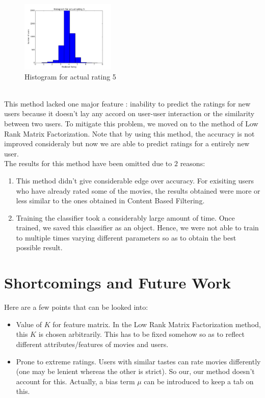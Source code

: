 \documentclass[twocolumn]{article}
\begin{document}
\begin{figure}
\centering
\includegraphics[width=0.4\textwidth]{hist_5.png}
\caption{Histogram for actual rating 5}
\end{figure}\\
\newline
This method lacked one major feature : inability to predict the ratings for new users because it doesn't lay any accord on user-user interaction or the similarity between two users. To mitigate this problem, we moved on to the method of Low Rank Matrix Factorization. Note that by using this method, the accuracy is not improved consideraly but now we are able to predict ratings for a entirely new user.\\
\newline
The results for this method have been omitted due to $2$ reasons:
\begin{enumerate}
\item This method didn't give considerable edge over accuracy. For exisiting users who have already rated some of the movies, the results obtained were more or less similar to the ones obtained in Content Based Filtering.
\item Training the classifier took a considerably large amount of time. Once trained, we saved this classifier as an object. Hence, we were not able to train to multiple times varying different parameters so as to obtain the best possible result.
\end{enumerate}
\section*{Shortcomings and Future Work}
Here are a few points that can be looked into:
\begin{itemize}
\item Value of $K$ for feature matrix. In the Low Rank Matrix Factorization method, this $K$ is chosen arbitrarily. This has to be fixed somehow so as to reflect different attributes/features of movies and users.
\item Prone to extreme ratings. Users with similar tastes can rate movies differently (one may be lenient whereas the other is strict). So our, our method doesn't account for this. Actually, a bias term $\mu$ can be introduced to keep a tab on this.
\end{itemize}
\end{document}
